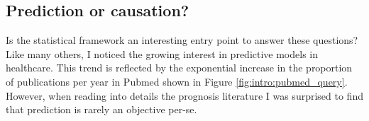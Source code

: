 \documentclass[french,12pt,twoside,a4paper]{book}
\begin{document}
\begin{background_box_left}

  \subsection{Prediction or causation?}%
  \label{subsec:intro:prediction_causation}%

  Is the statistical framework an interesting entry point to answer these
  questions? Like many others, I noticed the growing interest in predictive
  models in healthcare.  This trend is reflected by the exponential increase in
  the proportion of publications per year in Pubmed  shown in Figure
  \ref{fig:intro:pubmed_query}. However, when reading into details the prognosis
  literature I was surprised to find that prediction is rarely an objective
  per-se.


\end{background_box_left}
\end{document}
